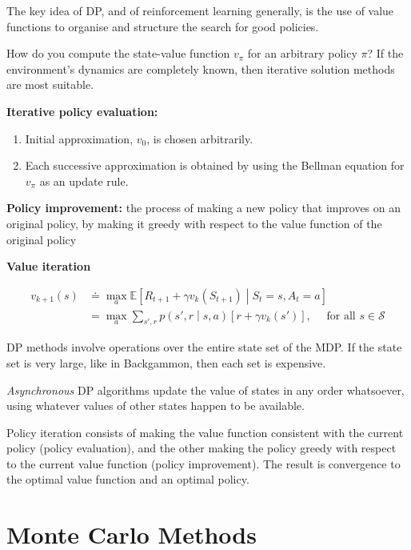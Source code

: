 \documentclass{article}
\begin{document}
The key idea of DP, and of reinforcement learning generally, is the use
of value functions to organise and structure the search for good
policies.

How do you compute the state-value function \(v_\pi\) for an arbitrary policy \(\pi\)? If the environment's dynamics are completely known, then iterative solution methods are most suitable.

\textbf{Iterative policy evaluation:}

\begin{enumerate}
\def\labelenumi{\arabic{enumi}.}
\item
  Initial approximation, \(v_0\), is chosen arbitrarily.
\item
  Each successive approximation is obtained by using the Bellman
  equation for \(v_\pi\) as an update rule.
\end{enumerate}

\textbf{Policy improvement:} the process of making a new policy that
improves on an original policy, by making it greedy with respect to the
value function of the original policy

\textbf{Value iteration}

\[
\begin{aligned}
  v_{k+1}(s)
  & \doteq \max_a \mathbb{E} \left[ R_{t+1} + \gamma v_k(S_{t+1}) \middle| S_t = s, A_t = a \right] 
  \\
  & = \max_a \sum_{s', r} p \left( s', r \middle| s, a \right) \left[ r + \gamma v_k(s') \right], 
  \quad \text{ for all $s \in \mathcal{S}$}
\end{aligned}
\]

DP methods involve operations over the entire state set of the MDP. If
the state set is very large, like in Backgammon, then each set is
expensive.

\emph{Asynchronous} DP algorithms update the value of states in any
order whatsoever, using whatever values of other states happen to be
available.

Policy iteration consists of making the value function consistent with
the current policy (policy evaluation), and the other making the policy
greedy with respect to the current value function (policy improvement).
The result is convergence to the optimal value function and an optimal
policy.

\section{Monte Carlo Methods}
\end{document}

